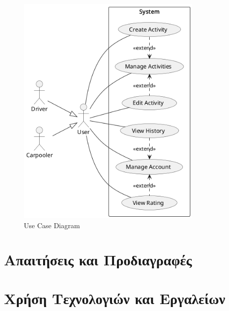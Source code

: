 \documentclass[11pt]{article}
\begin{document}
\begin{figure}
    \centering
    \includegraphics[width=0.8\textwidth]{uml/use-cases}
    \caption{Use Case Diagram}
\end{figure}

\section{Απαιτήσεις και Προδιαγραφές}

\section{Χρήση Τεχνολογιών και Εργαλείων}
\end{document}

